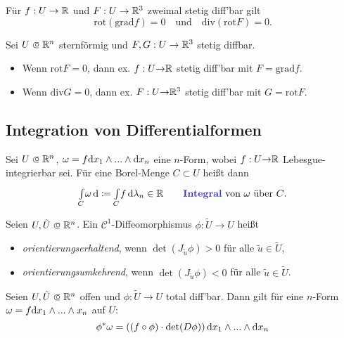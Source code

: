 \documentclass{cheat-sheet}
\newcommand{\grad}{\mathrm{grad}} %
\newcommand{\divergence}{\mathrm{div}} %
\newcommand{\rot}{\mathrm{rot}} %
\theoremstyle{definition}
\begin{document}
\begin{lem}
  Für $f : U \to \mathbb{R}$ und $F : U \to \mathbb{R}^3$ zweimal stetig diff'bar gilt
  \[
    \rot (\grad f) = 0
    \quad \text{und} \quad
    \divergence(\rot F) = 0.
  \]
\end{lem}

\begin{samepage}

\begin{lem}
  Sei $U \opn \R^n$ sternförmig und $F, G : U \to \mathbb{R}^3$ stetig diffbar.
  \begin{itemize}
    \item Wenn $\rot F = 0$, dann ex. $f : U {\to} \mathbb{R}$ stetig diff'bar mit $F = \grad f$.
    \item Wenn $\divergence G = 0$, dann ex. $F : U {\to} \mathbb{R}^3$ stetig diff'bar mit $G = \rot F$.
  \end{itemize}
\end{lem}

\subsection{Integration von Differentialformen}

\end{samepage}

\begin{defn}
  Sei $U \opn \R^n$, $\omega = f \mathrm{d} x_1 \wedge ... \wedge \mathrm{d} x_n$ eine $n$-Form, wobei $f : U {\to} \mathbb{R}$ Lebesgue-integrierbar sei. Für eine Borel-Menge $C \subset U$ heißt dann
  \[
    \Int{C}{}{\omega}{} \coloneqq \Int{C}{}{f}{\lambda_n} \in \R
    \qquad \text{\emph{Integral} von $\omega$ über $C$.}
  \]
\end{defn}

\begin{defn}
  Seien $U, \tilde{U} \opn \R^n$. Ein $\mathcal{C}^1$-Diffeomorphismus $\phi : \tilde{U} \to U$ heißt
  \begin{itemize}
    \item \emph{orientierungserhaltend}, wenn $\det (J_{\tilde{u}} \phi) > 0$ für alle $\tilde{u} \in \tilde{U}$,
    \item \emph{orientierungsumkehrend}, wenn $\det (J_{\tilde{u}} \phi) < 0$ für alle $\tilde{u} \in \tilde{U}$.
  \end{itemize}
\end{defn}

\begin{lem}
  Seien $U, \tilde{U} \opn \R^n$ offen und $\phi : \widetilde{U} \to U$ total diff'bar. Dann gilt für eine $n$-Form $\omega = f \mathrm{d} x_1 \wedge ... \wedge x_n$ auf $U$:
  \[ \phi^* \omega = ((f \circ \phi) \cdot \det(D\phi)) \, \mathrm{d} x_1 \wedge ... \wedge \mathrm{d} x_n \]
\end{lem}
\end{document}
